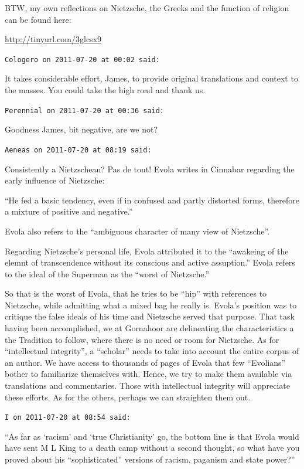 \begin{footnotesize}
\begin{sffamily}
BTW, my own reflections on Nietzsche, the Greeks and the function of religion can be found here:

\url{http://tinyurl.com/3glcsx9}


\hfill

\texttt{Cologero on 2011-07-20 at 00:02 said:}

It takes considerable effort, James, to provide original translations and context to the masses. You could take the high road and thank us.

\hfill

\texttt{Perennial on 2011-07-20 at 00:36 said:}

Goodness James, bit negative, are we not?

\hfill

\texttt{Aeneas on 2011-07-20 at 08:19 said:}

Consistently a Nietzschean? Pas de tout! Evola writes in Cinnabar regarding the early influence of Nietzsche:

``He fed a basic tendency, even if in confused and partly distorted forms, therefore a mixture of positive and negative.''

Evola also refers to the ``ambiguous character of many view of Nietzsche''.

Regarding Nietzsche's personal life, Evola attributed it to the ``awakeing of the elemnt of transcendence without its conscious and active assuption.'' Evola refers to the ideal of the Superman as the ``worst of Nietzsche.''

So that is the worst of Evola, that he tries to be ``hip'' with references to Nietzsche, while admitting what a mixed bag he really is. Evola's position was to critique the false ideals of his time and Nietzsche served that purpose. That task having been accomplished, we at Gornahoor are delineating the characteristics a the Tradition to follow, where there is no need or room for Nietzsche. As for ``intellectual integrity'', a ``scholar'' needs to take into account the entire corpus of an author. We have access to thousands of pages of Evola that few ``Evolians'' bother to familiarize themselves with. Hence, we try to make them available via translations and commentaries. Those with intellectual integrity will appreciate these efforts. As for the others, perhaps we can straighten them out.

\hfill

\texttt{I on 2011-07-20 at 08:54 said:}

``As far as `racism' and `true Christianity' go, the bottom line is that Evola would have sent M L King to a death camp without a second thought, so what have you proved about his ``sophisticated'' versions of racism, paganism and state power?''


\end{sffamily}
\end{footnotesize}
